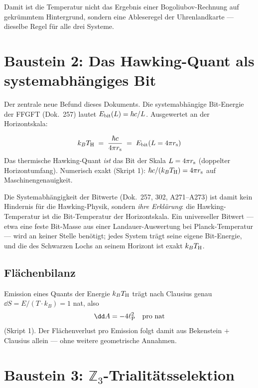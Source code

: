 Damit ist die Temperatur nicht das Ergebnis einer Bogoliubov-Rechnung
auf gekrümmtem Hintergrund, sondern eine Ableseregel der
Uhrenlandkarte — dieselbe Regel für alle drei Systeme.

\section{Baustein 2: Das Hawking-Quant als systemabhängiges Bit}

Der zentrale neue Befund dieses Dokuments. Die systemabhängige
Bit-Energie der FFGFT (Dok.\ 257) lautet $E_{\mathrm{bit}}(L) = \hbar c/L$.
Ausgewertet an der Horizontskala:

\begin{tcolorbox}[ffgftbox, title={Kernresultat \K}]
  \begin{equation}
    k_B T_{\mathrm{H}} \;=\; \frac{\hbar c}{4\pi r_{\mathrm{s}}}
    \;=\; E_{\mathrm{bit}}\!\left(L = 4\pi r_{\mathrm{s}}\right)
  \end{equation}
  Das thermische Hawking-Quant \emph{ist} das Bit der Skala
  $L = 4\pi r_{\mathrm{s}}$ (doppelter Horizontumfang).
  Numerisch exakt (Skript 1): $\hbar c/(k_BT_{\mathrm{H}}) = 4\pi r_{\mathrm{s}}$ auf
  Maschinengenauigkeit.
\end{tcolorbox}

Die Systemabhängigkeit der Bitwerte (Dok.\ 257, 302, A271–A273)
ist damit kein Hindernis für die Hawking-Physik, sondern
\emph{ihre Erklärung}: die Hawking-Temperatur ist die Bit-Temperatur
der Horizontskala. Ein universeller Bitwert — etwa eine feste
Bit-Masse aus einer Landauer-Auswertung bei Planck-Temperatur —
wird an keiner Stelle benötigt; jedes System trägt seine eigene
Bit-Energie, und die des Schwarzen Lochs an seinem Horizont ist
exakt $k_BT_{\mathrm{H}}$.

\subsection{Flächenbilanz}\label{sec:flaeche}

Emission eines Quants der Energie $k_BT_{\mathrm{H}}$ trägt nach Clausius
genau $\dd S = E/(T\cdot k_B) = 1$ nat, also
\begin{equation}
  \dd A = -4\lP^2 \quad\text{pro nat}
\end{equation}
(Skript 1). Der Flächenverlust pro Emission folgt damit aus
Bekenstein $+$ Clausius allein — ohne weitere geometrische Annahmen. \B

\section{Baustein 3: \texorpdfstring{$\mathbb{Z}_3$}{Z3}-Trialitätsselektion}

